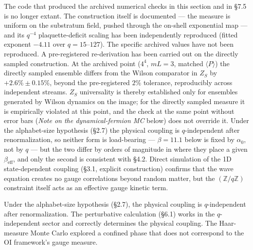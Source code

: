 \documentclass[
]{article}
\begin{document}
The code that produced the archived numerical checks in this section and
in §7.5 is no longer extant. The construction itself is documented ---
the measure is uniform on the substratum field, pushed through the
on-shell exponential map --- and its \(q^{-4}\) plaquette-deficit
scaling has been independently reproduced (fitted exponent \(-4.11\)
over \(q = 15\)--\(127\)). The specific archived values have not been
reproduced. A pre-registered re-derivation has been carried out on the
directly sampled construction. At the archived point (\(4^4\),
\(mL = 3\), matched \(\langle P\rangle\)) the directly sampled ensemble
differs from the Wilson comparator in \(Z_S\) by \(+2.6\% \pm 0.15\%\),
beyond the pre-registered \(2\%\) tolerance, reproducibly across
independent streams. \(Z_S\) universality is thereby established only
for ensembles generated by Wilson dynamics on the image; for the
directly sampled measure it is empirically violated at this point, and
the check at the same point without error bars (\emph{Note on the
dynamical-fermion MC} below) does not override it. Under the
alphabet-size hypothesis (§2.7) the physical coupling is
\(q\)-independent after renormalization, so neither form is load-bearing
--- \(\beta = 11.1\) below is fixed by \(\alpha_0\), not by \(q\) ---
but the two differ by orders of magnitude in where they place a given
\(\beta_{\text{eff}}\), and only the second is consistent with §4.2.
Direct simulation of the 1D state-dependent coupling (§3.1, explicit
construction) confirms that the wave equation creates no gauge
correlations beyond random matter, but the \((\mathbb{Z}/q\mathbb{Z})\)
constraint itself acts as an effective gauge kinetic term.

Under the alphabet-size hypothesis (§2.7), the physical coupling is
\(q\)-independent after renormalization. The perturbative calculation
(§6.1) works in the \(q\)-independent sector and correctly determines
the physical coupling. The Haar-measure Monte Carlo explored a confined
phase that does not correspond to the OI framework's gauge measure.
\end{document}
